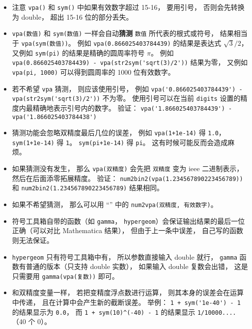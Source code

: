 \begin{itemize}
\item 注意 \verb`vpa()` 和 \verb`sym()` 中如果有效数字超过 15-16， 要用引号， 否则会先转换为 double， 超出 15-16 位的部分丢失。

\item \verb`vpa(数值)` 和 \verb`sym(数值)` 一样会自动\textbf{猜测} \verb`数值` 所代表的根式或符号， 结果相当于 \verb`vpa(sym(数值))`。 例如 \verb`vpa(0.866025403784439)` 的结果是表达式 $\sqrt{3}/2$， 又例如 \verb`sym(pi)` 的结果是精确的圆周率符号 $\pi$。 例如 \verb`vpa(0.866025403784439) - vpa(str2sym('sqrt(3)/2'))` 结果为零， 又例如 \verb`vpa(pi, 1000)` 可以得到圆周率的 1000 位有效数字。

\item  若不希望 \verb`vpa` 猜测， 则应该使用引号， 例如 \verb`vpa('0.866025403784439') - vpa(str2sym('sqrt(3)/2'))` 不为零。 使用引号可以在当前 \verb`digits` 设置的精度内最精确地表示引号内的数字。 验证： \verb`vpa('1.866025403784439') - vpa('1.866025403784438')`

\item 猜测功能会忽略双精度最后几位的误差， 例如 \verb`vpa(1+1e-14)` 得 \verb`1.0`， \verb`sym(1+1e-14)` 得 \verb`1`。 \verb`sym(pi+1e-14)` 得 \verb`pi`。 这有时候可能反而会造成麻烦。

\item 如果猜测没有发生， 那么 \verb`vpa(双精度)` 会先把 \verb`双精度` 变为 ieee 二进制表示， 然后在后面添零拓展精度。 验证： \verb`num2bin2(vpa(1.234567890223456789))` 和 \verb`num2bin2(1.234567890223456789)` 结果相同。

\item 如果不希望猜测， 那么可以用 “” 中的 \verb`num2vpa(双精度, 有效数字)`。

\item 符号工具箱自带的函数（如 \verb`gamma`， \verb`hypergeom`）会保证输出结果的最后一位正确（可以对比 Mathematica 结果）， 但由于上一条中误差， 自己写的函数则无法保证。

\item \verb`hypergeom` 只有符号工具箱中有， 所以参数直接输入 double 就行， \verb`gamma` 函数有普通的版本（只支持 double 实数）， 如果输入 double 复数会出错， 这是只需要用 \verb`gamma(vpa(复数))` 即可。

\item 和双精度变量一样， 若把变精度浮点数进行运算， 则其本身的误差会在运算中传递， 且在计算中会产生新的截断误差。 举例： \verb`1 + sym('1e-40') - 1` 的结果显示为 \verb`0.0`， 而 \verb`1 + sym(10)^(-40) - 1` 的结果显示 \verb`1/10000....`（40 个 0）。


\end{itemize}
